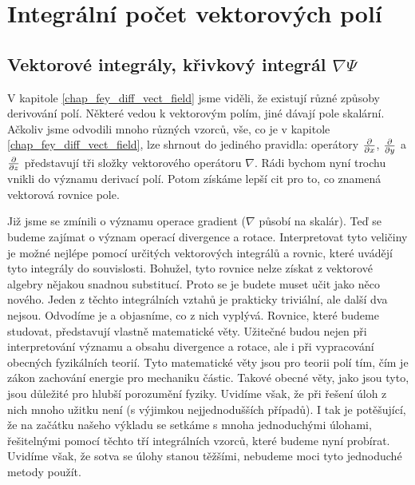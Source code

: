 \chapter{Integrální počet vektorových polí}\label{chap:fey_int_vec_field}
\minitoc
\newpage
  \section{Vektorové integrály, křivkový integrál \texorpdfstring{\(\nabla\Psi\)}{nabla psi}}
    V kapitole \ref{chap_fey_diff_vect_field} jsme viděli, že existují různé způsoby derivování 
    polí. Některé vedou k vektorovým polím, jiné dávají pole skalární. Ačkoliv jsme odvodili mnoho 
    různých vzorců, vše, co je v kapitole \ref{chap_fey_diff_vect_field}, lze shrnout do jediného 
    pravidla: operátory \(\frac{\partial  }{\partial x}\), \(\frac{\partial  }{\partial y}\) a \(\frac{\partial  }{\partial z}\) představují tři složky 
    vektorového operátoru \(\nabla\). Rádi bychom nyní trochu vnikli do významu derivací polí. Potom 
    získáme lepší cit pro to, co znamená vektorová rovnice pole.
    
    Již jsme se zmínili o významu operace gradient (\(\nabla\) působí na skalár). Teď se budeme  
    zajímat o význam operací divergence a rotace. Interpretovat tyto veličiny je možné nejlépe 
    pomocí určitých vektorových integrálů a rovnic, které uvádějí tyto integrály do souvislosti. 
    Bohužel, tyto rovnice nelze získat z vektorové algebry nějakou snadnou substitucí. Proto se je 
    budete muset učit jako něco nového. Jeden z těchto integrálních vztahů je prakticky triviální, 
    ale další dva nejsou. Odvodíme je a objasníme, co z nich vyplývá. Rovnice, které budeme 
    studovat, představují vlastně matematické věty. Užitečné budou nejen při interpretování významu 
    a obsahu divergence a rotace, ale i při vypracování obecných fyzikálních teorií. Tyto 
    matematické věty jsou pro teorii polí tím, čím je zákon zachování energie pro mechaniku 
    částic. Takové obecné věty, jako jsou tyto, jsou důležité pro hlubší porozumění fyziky. Uvidíme 
    však, že při řešení úloh z nich mnoho užitku není (s výjimkou nejjednodušších případů). I tak je 
    potěšující, že na začátku našeho výkladu se setkáme s mnoha jednoduchými úlohami, řešitelnými 
    pomocí těchto tří integrálních vzorců, které budeme nyní probírat. Uvidíme však, že sotva se 
    úlohy stanou těžšími, nebudeme moci tyto jednoduché metody použít.
    
